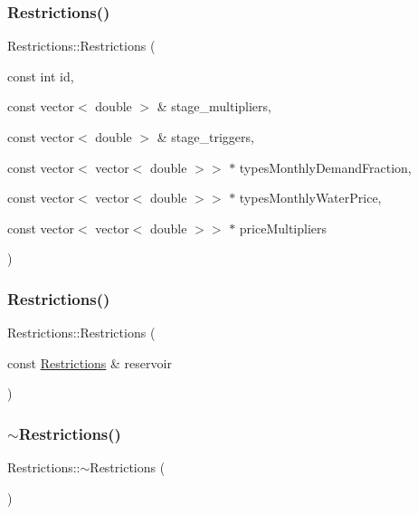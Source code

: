 \subsubsection{\texorpdfstring{Restrictions()}{Restrictions()}\hspace{0.1cm}{\footnotesize\ttfamily [2/3]}}
{\footnotesize\ttfamily Restrictions\+::\+Restrictions (\begin{DoxyParamCaption}\item[{const int}]{id,  }\item[{const vector$<$ double $>$ \&}]{stage\+\_\+multipliers,  }\item[{const vector$<$ double $>$ \&}]{stage\+\_\+triggers,  }\item[{const vector$<$ vector$<$ double $>$$>$ $\ast$}]{types\+Monthly\+Demand\+Fraction,  }\item[{const vector$<$ vector$<$ double $>$$>$ $\ast$}]{types\+Monthly\+Water\+Price,  }\item[{const vector$<$ vector$<$ double $>$$>$ $\ast$}]{price\+Multipliers }\end{DoxyParamCaption})}

\mbox{\label{classRestrictions_aa8653b70ff7eedb4e8fc1b21ebf2ead9_aa8653b70ff7eedb4e8fc1b21ebf2ead9}} 
\subsubsection{\texorpdfstring{Restrictions()}{Restrictions()}\hspace{0.1cm}{\footnotesize\ttfamily [3/3]}}
{\footnotesize\ttfamily Restrictions\+::\+Restrictions (\begin{DoxyParamCaption}\item[{const \mbox{\hyperlink{classRestrictions}{Restrictions}} \&}]{reservoir }\end{DoxyParamCaption})}

\mbox{\label{classRestrictions_a54c8a857a2beed78d34a46c36951b004_a54c8a857a2beed78d34a46c36951b004}} 
\subsubsection{\texorpdfstring{$\sim$\+Restrictions()}{~Restrictions()}}
{\footnotesize\ttfamily Restrictions\+::$\sim$\+Restrictions (\begin{DoxyParamCaption}{ }\end{DoxyParamCaption})}



